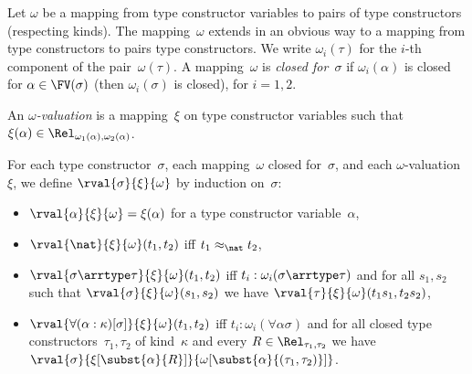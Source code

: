 \begin{definition}\label{def_param_valuation}\normalfont
  Let $\omega$ be a mapping from type constructor variables to pairs
  of type constructors (respecting kinds). The mapping~$\omega$
  extends in an obvious way to a mapping from type constructors to
  pairs type constructors. We write $\omega_i(\tau)$ for the $i$-th
  component of the pair~$\omega(\tau)$. A mapping~$\omega$ is
  \emph{closed for~$\sigma$} if $\omega_i(\alpha)$ is closed for
  $\alpha \in \FV(\sigma)$ (then $\omega_i(\sigma)$ is closed), for
  $i=1,2$.

  An \emph{$\omega$-valuation} is a mapping~$\xi$ on type constructor
  variables such that $\xi(\alpha) \in
  \Rel_{\omega_1(\alpha),\omega_2(\alpha)}$.

  For each type constructor~$\sigma$, each mapping~$\omega$ closed
  for~$\sigma$, and each $\omega$-valuation~$\xi$, we define
  $\rval{\sigma}{\xi}{\omega}$ by induction on~$\sigma$:
  \begin{itemize}
  \item $\rval{\alpha}{\xi}{\omega} = \xi(\alpha)$ for a type
    constructor variable~$\alpha$,
  \item $\rval{\nat}{\xi}{\omega}(t_1,t_2)$ iff $t_1 \approx_\nat t_2$,
  \item $\rval{\sigma \arrtype \tau}{\xi}{\omega}(t_1,t_2)$ iff $t_i :
    \omega_i(\sigma\arrtype\tau)$ and for all $s_1,s_2$ such that
    $\rval{\sigma}{\xi}{\omega}(s_1,s_2)$ we have
    $\rval{\tau}{\xi}{\omega}(t_1 s_1, t_2 s_2)$,
  \item $\rval{\forall(\alpha:\kappa)[\sigma]}{\xi}{\omega}(t_1,t_2)$
    iff $t_i : \omega_i(\forall\alpha\sigma)$ and for all closed type
    constructors~$\tau_1,\tau_2$ of kind~$\kappa$ and every $R \in
    \Rel_{\tau_1,\tau_2}$ we have
    $\rval{\sigma}{\xi[\subst{\alpha}{R}]}{\omega[\subst{\alpha}{(\tau_1,\tau_2)}]}$.
  \end{itemize}
\end{definition}


